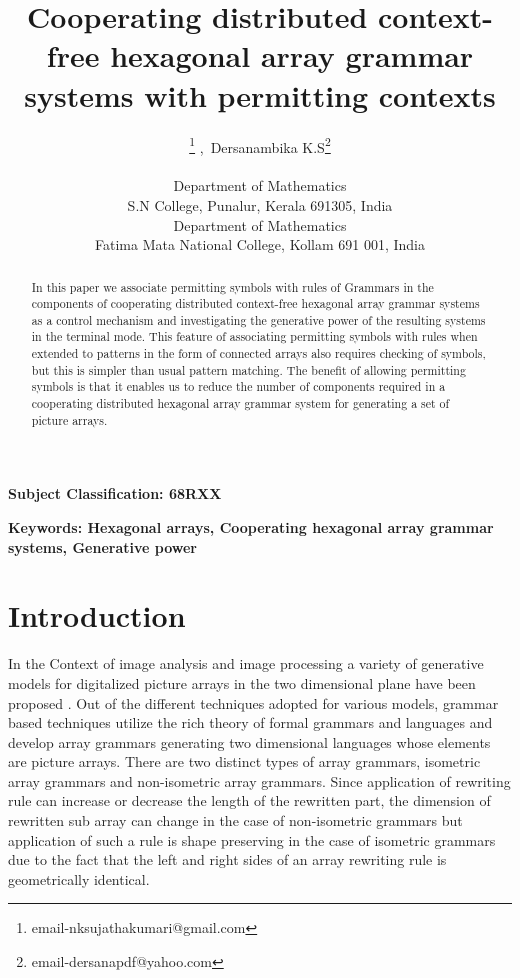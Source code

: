 \documentclass[11pt]{article}
\title{\textbf{ Cooperating distributed context-free hexagonal array grammar systems with permitting contexts }}
\author {\footnote{email-nksujathakumari@gmail.com} ,\ Dersanambika K.S\footnote{email-dersanapdf@yahoo.com}\\
\date{}
\small{ Department of Mathematics}\\\small{S.N College,
Punalur, Kerala 691305, India}\\\small{ Department of
Mathematics}\\\small{Fatima Mata National College, Kollam 691 001,
India}\\}
\begin{document}
\maketitle
\begin{abstract}{In this paper we associate permitting symbols with rules of Grammars in the components of cooperating
 distributed context-free hexagonal array grammar systems as a control mechanism and investigating the generative power
  of the resulting systems in the terminal mode. This feature of associating permitting symbols with rules when extended
   to patterns in the form of connected arrays also requires checking of symbols, but this is simpler than usual pattern
    matching. The benefit of allowing permitting symbols is that it enables us to reduce the number of components required
     in a cooperating distributed hexagonal array grammar system for generating a set of picture arrays.}
\end{abstract}

\noindent\textbf{Subject Classification: 68RXX}

\noindent\textbf{Keywords: Hexagonal arrays, Cooperating hexagonal
array grammar systems, Generative power}
\section{Introduction}
In the Context of image analysis and image processing a variety of
generative models for digitalized picture arrays in the two
dimensional plane have been proposed \cite{10}. Out of the
different techniques adopted for various models, grammar based
techniques utilize the rich theory of formal grammars and
languages and develop array grammars generating two dimensional
languages whose elements are picture arrays. There are two
distinct types of array grammars, isometric array grammars and
non-isometric array grammars. Since application of rewriting rule
can increase or decrease the length of the rewritten part, the
dimension of rewritten sub array can change in the case of
non-isometric grammars but application of such a rule is shape
preserving in the case of isometric grammars due to the fact that
the left and right sides of an array rewriting rule is
geometrically identical.
\end{document}
